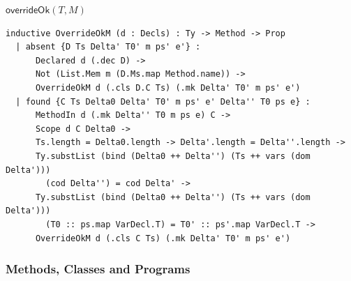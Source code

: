 \begin{cmp}{$\mathsf{overrideOk}(T,M)$}
\begin{paperside}
\end{paperside}
\begin{leanside}
\begin{lstlisting}[style=leanside]
inductive OverrideOkM (d : Decls) : Ty -> Method -> Prop
  | absent {D Ts Delta' T0' m ps' e'} :
      Declared d (.dec D) ->
      Not (List.Mem m (D.Ms.map Method.name)) ->
      OverrideOkM d (.cls D.C Ts) (.mk Delta' T0' m ps' e')
  | found {C Ts Delta0 Delta' T0' m ps' e' Delta'' T0 ps e} :
      MethodIn d (.mk Delta'' T0 m ps e) C ->
      Scope d C Delta0 ->
      Ts.length = Delta0.length -> Delta'.length = Delta''.length ->
      Ty.substList (bind (Delta0 ++ Delta'') (Ts ++ vars (dom Delta')))
        (cod Delta'') = cod Delta' ->
      Ty.substList (bind (Delta0 ++ Delta'') (Ts ++ vars (dom Delta')))
        (T0 :: ps.map VarDecl.T) = T0' :: ps'.map VarDecl.T ->
      OverrideOkM d (.cls C Ts) (.mk Delta' T0' m ps' e')
\end{lstlisting}
\end{leanside}
\end{cmp}

\subsubsection{Methods, Classes and Programs}

